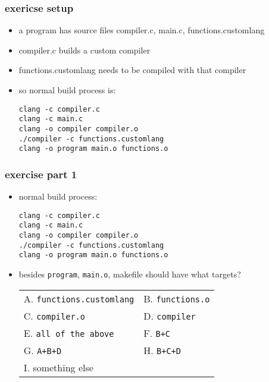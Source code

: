 \begin{FragileFrame}
\frametitle{exericse setup}
    \begin{itemize}
    \item a program has source files compiler.c, main.c, functions.customlang
    \item compiler.c builds a custom compiler
    \item functions.customlang needs to be compiled with that compiler
    \item so normal build process is:
\begin{Verbatim}[frame=single,fontsize=\fontsize{9}{10}]
clang -c compiler.c
clang -c main.c
clang -o compiler compiler.o
./compiler -c functions.customlang
clang -o program main.o functions.o
\end{Verbatim}
    \end{itemize}
\end{FragileFrame}

\begin{FragileFrame}
\frametitle{exercise part 1}
    \begin{itemize}
    \item normal build process:
\begin{Verbatim}[frame=single,fontsize=\fontsize{10}{11}]
clang -c compiler.c
clang -c main.c
clang -o compiler compiler.o
./compiler -c functions.customlang
clang -o program main.o functions.o
\end{Verbatim}
    \item besides \texttt{program}, \texttt{main.o}, makefile should have what targets?
\begin{tabular}{ll}
    A. \texttt{functions.customlang} & B. \texttt{functions.o} \\
    C. \texttt{compiler.o} & D. \texttt{compiler} \\
    E. \texttt{all of the above} & F. \texttt{B+C} \\
    G. \texttt{A+B+D} & H. \texttt{B+C+D} \\
    I. something else 
\end{tabular}
    \end{itemize}
\end{FragileFrame}


